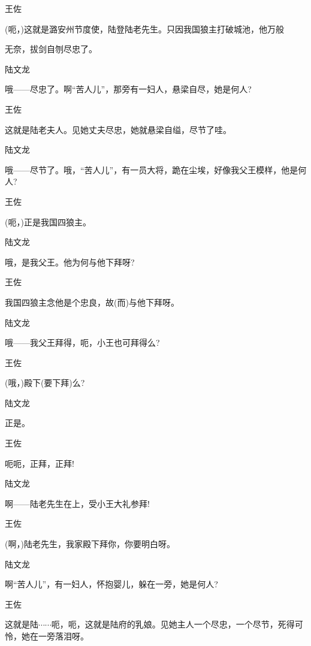{{{王佐

(呃，)这就是潞安州节度使，陆登陆老先生。只因我国狼主打破城池，他万般

无奈，拔剑自刎尽忠了。}

{陆文龙

哦------尽忠了。啊``苦人儿''，那旁有一妇人，悬梁自尽，她是何人?}

{王佐\hspace{30pt}~

这就是陆老夫人。见她丈夫尽忠，她就悬梁自缢，尽节了哇。}

{陆文龙

哦------尽节了。哦，``苦人儿''，有一员大将，跪在尘埃，好像我父王模样，他是何人?}

{王佐\hspace{30pt}~

(呃，)正是我国四狼主。}

{陆文龙\hspace{20pt}~

哦，是我父王。他为何与他下拜呀?}

{王佐\hspace{30pt}~

我国四狼主念他是个忠良，故(而)与他下拜呀。}

{陆文龙\hspace{20pt}~

哦------我父王拜得，呃，小王也可拜得么?}

{王佐\hspace{30pt}~

(哦，)殿下(要下拜)么?}

{陆文龙\hspace{20pt}~

正是。}

{王佐\hspace{30pt}~

呃呃，正拜，正拜!}

{陆文龙\hspace{20pt}~

啊------陆老先生在上，受小王大礼参拜!}

{王佐\hspace{30pt}~

(啊，)陆老先生，我家殿下拜你，你要明白呀。}

{陆文龙\hspace{20pt}~

啊``苦人儿''，有一妇人，怀抱婴儿，躲在一旁，她是何人?}

{王佐

这就是陆$\cdots{}\cdots{}$呃，呃，这就是陆府的乳娘。见她主人一个尽忠，一个尽节，死得可怜，她在一旁落泪呀。}

}}
